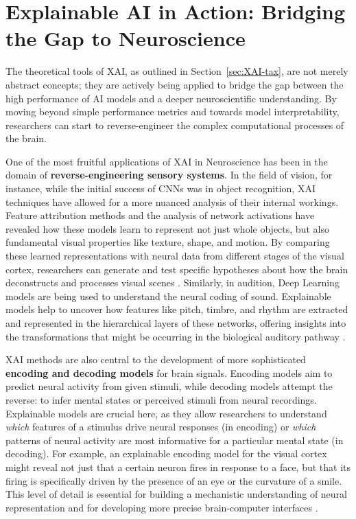 \section{Explainable AI in Action: Bridging the Gap to Neuroscience}

The theoretical tools of XAI, as outlined in Section~\ref{sec:XAI-tax}, are not merely abstract concepts; they are actively being applied to bridge the gap between the high performance of AI models and a deeper neuroscientific understanding. By moving beyond simple performance metrics and towards model interpretability, researchers can start to reverse-engineer the complex computational processes of the brain.

One of the most fruitful applications of XAI in Neuroscience has been in the domain of \textbf{reverse-engineering sensory systems}. In the field of vision, for instance, while the initial success of CNNs was in object recognition, XAI techniques have allowed for a more nuanced analysis of their internal workings. Feature attribution methods and the analysis of network activations have revealed how these models learn to represent not just whole objects, but also fundamental visual properties like texture, shape, and motion. By comparing these learned representations with neural data from different stages of the visual cortex, researchers can generate and test specific hypotheses about how the brain deconstructs and processes visual scenes \cite{yamins2016using, kriegeskorte2018cognitive}. Similarly, in audition, Deep Learning models are being used to understand the neural coding of sound. Explainable models help to uncover how features like pitch, timbre, and rhythm are extracted and represented in the hierarchical layers of these networks, offering insights into the transformations that might be occurring in the biological auditory pathway \cite{richards2019deep}.

XAI methods are also central to the development of more sophisticated \textbf{encoding and decoding models} for brain signals. Encoding models aim to predict neural activity from given stimuli, while decoding models attempt the reverse: to infer mental states or perceived stimuli from neural recordings. Explainable models are crucial here, as they allow researchers to understand \textit{which} features of a stimulus drive neural responses (in encoding) or \textit{which} patterns of neural activity are most informative for a particular mental state (in decoding). For example, an explainable encoding model for the visual cortex might reveal not just that a certain neuron fires in response to a face, but that its firing is specifically driven by the presence of an eye or the curvature of a smile. This level of detail is essential for building a mechanistic understanding of neural representation and for developing more precise brain-computer interfaces \cite{schrimpf2020brain}.

